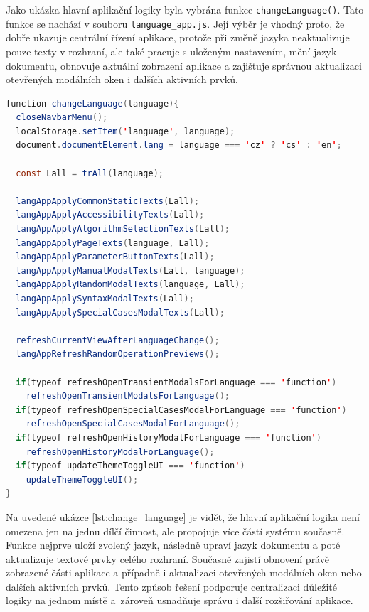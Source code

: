 Jako ukázka hlavní aplikační logiky byla vybrána funkce \texttt{changeLanguage()}. Tato funkce se nachází v souboru \texttt{language\_app.js}. Její výběr je vhodný proto, že dobře ukazuje centrální řízení aplikace, protože při změně jazyka neaktualizuje pouze texty v rozhraní, ale také pracuje s uloženým nastavením, mění jazyk dokumentu, obnovuje aktuální zobrazení aplikace a zajišťuje správnou aktualizaci otevřených modálních oken i dalších aktivních prvků.

\begin{lstlisting}[language=Java, caption={Ukázka hlavní aplikační logiky ve funkci changeLanguage()}, label={lst:change_language}]
function changeLanguage(language){
  closeNavbarMenu();
  localStorage.setItem('language', language);
  document.documentElement.lang = language === 'cz' ? 'cs' : 'en';

  const Lall = trAll(language);

  langAppApplyCommonStaticTexts(Lall);
  langAppApplyAccessibilityTexts(Lall);
  langAppApplyAlgorithmSelectionTexts(Lall);
  langAppApplyPageTexts(language, Lall);
  langAppApplyParameterButtonTexts(Lall);
  langAppApplyManualModalTexts(Lall, language);
  langAppApplyRandomModalTexts(language, Lall);
  langAppApplySyntaxModalTexts(Lall);
  langAppApplySpecialCasesModalTexts(Lall);

  refreshCurrentViewAfterLanguageChange();
  langAppRefreshRandomOperationPreviews();

  if(typeof refreshOpenTransientModalsForLanguage === 'function')
    refreshOpenTransientModalsForLanguage();
  if(typeof refreshOpenSpecialCasesModalForLanguage === 'function')
    refreshOpenSpecialCasesModalForLanguage();
  if(typeof refreshOpenHistoryModalForLanguage === 'function')
    refreshOpenHistoryModalForLanguage();
  if(typeof updateThemeToggleUI === 'function')
    updateThemeToggleUI();
}
\end{lstlisting}

Na uvedené ukázce \ref{lst:change_language} je vidět, že hlavní aplikační logika není omezena jen na jednu dílčí činnost, ale propojuje více částí systému současně. Funkce nejprve uloží zvolený jazyk, následně upraví jazyk dokumentu a poté aktualizuje textové prvky celého rozhraní. Současně zajistí obnovení právě zobrazené části aplikace a případně i aktualizaci otevřených modálních oken nebo dalších aktivních prvků. Tento způsob řešení podporuje centralizaci důležité logiky na jednom místě a~zároveň usnadňuje správu i další rozšiřování aplikace.

